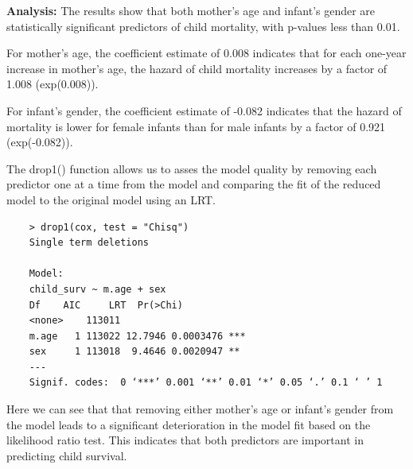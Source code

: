 \documentclass[12pt,letterpaper]{article}
\begin{document}
\textbf{Analysis:} 
\noindent The results show that both mother's age and infant's gender are statistically significant predictors of child mortality, with p-values less than 0.01.

For mother's age, the coefficient estimate of 0.008 indicates that for each one-year increase in mother's age, the hazard of child mortality increases by a factor of 1.008 (exp(0.008)).

For infant's gender, the coefficient estimate of -0.082 indicates that the hazard of mortality is lower for female infants than for male infants by a factor of 0.921 (exp(-0.082)). 

The drop1() function allows us to asses the  model quality by removing each predictor one at a time from the model and comparing the fit of the reduced model to the original model using an LRT.
\\

\begin{Verbatim}
	> drop1(cox, test = "Chisq")
	Single term deletions
	
	Model:
	child_surv ~ m.age + sex
	Df    AIC     LRT  Pr(>Chi)    
	<none>    113011                      
	m.age   1 113022 12.7946 0.0003476 ***
	sex     1 113018  9.4646 0.0020947 ** 
	---
	Signif. codes:  0 ‘***’ 0.001 ‘**’ 0.01 ‘*’ 0.05 ‘.’ 0.1 ‘ ’ 1
\end{Verbatim}

\noindent Here we can see that that removing either mother's age or infant's gender from the model leads to a significant deterioration in the model fit based on the likelihood ratio test. This indicates that both predictors are important in predicting child survival. 
\end{document}
